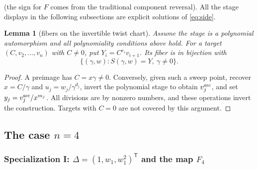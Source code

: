 \documentclass[11pt]{article}
\numberwithin{equation}{section}
\theoremstyle{plain}
\newtheorem{lemma}[theorem]{Lemma}
\theoremstyle{definition}
\theoremstyle{remark}
\begin{document}
(the sign for $F$ comes from the traditional component reversal). All the
stage displays in the following subsections are explicit solutions of
\eqref{eq:side}.

\begin{lemma}[fibers on the invertible twist chart]\label{lem:twist-fibers}
Assume the stage is a polynomial automorphism and all polynomiality
conditions above hold. For a target $(C,v_2,\ldots,v_n)$ with $C\ne0$,
put $Y_i=C^{e_i}v_{i+1}$. Its fiber is in bijection with
\[
 \{(\gamma,w):S(\gamma,w)=Y,\ \gamma\ne0\}.
\]
\end{lemma}
\begin{proof}
A preimage has $C=x\gamma\ne0$. Conversely, given such a sweep point,
recover $x=C/\gamma$ and $u_j=w_j/\gamma^{d_j}$, invert the polynomial
stage to obtain $v_j^{\rm src}$, and set $y_j=v_j^{\rm src}/x^{m_j}$.
All divisions are by nonzero numbers, and these operations invert the
construction. Targets with $C=0$ are not covered by this argument.
\end{proof}

\subsection{The case \texorpdfstring{$n=4$}{n=4}}\label{subsec:n4}

\subsubsection{Specialization I: \texorpdfstring{$\Delta=(1,w_1,w_1^2)^{\mathsf T}$ and the map $F_4$}{the curve-type field and F4}}
\label{subsec:specI}
\end{document}
